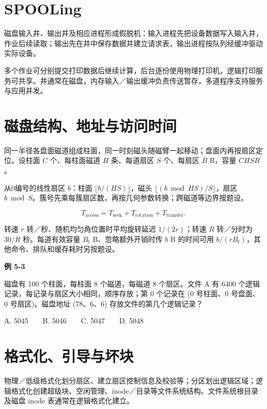 \section{SPOOLing}\label{OS05-spooling}

磁盘输入井、输出井及相应进程形成假脱机：输入进程先把设备数据写入输入井，作业后续读取；输出先在井中保存数据并建立请求表，输出进程按队列经缓冲驱动实际设备。

多个作业可分别提交打印数据后继续计算，后台逐份使用物理打印机，逻辑打印服务可共享。井通常在磁盘，内存输入／输出缓冲负责传送暂存，多道程序支持服务与应用并发。

\section{磁盘结构、地址与访问时间}\label{OS05-disk}

同一半径各盘面磁道组成柱面，同一时刻磁头随磁臂一起移动；盘面内再按扇区定位。设柱面 \(C\) 个、每柱面磁道 \(H\) 条、每道扇区 \(S\) 个、每扇区 \(B\) B，容量 \(CHSB\)。

从0编号的线性扇区 \(b\)：柱面 \(\lfloor b/(HS)\rfloor\)，磁头 \(\lfloor(b\bmod HS)/S\rfloor\)，扇区 \(b\bmod S\)。簇号先乘每簇扇区数，再按几何参数转换；跨磁道等边界按题设。

\[T_{\mathrm{access}}=T_{\mathrm{seek}}+T_{\mathrm{rotation}}+T_{\mathrm{transfer}}.\]

转速 \(r\) 转／秒、随机均匀角位置时平均旋转延迟 \(1/(2r)\)；转速 \(R\) 转／分时为 \(30/R\) 秒。每道有效容量 \(B_t\) B、忽略额外开销时传 \(b\) B 的时间可用 \(b/(rB_t)\)，其他命令、排队和缓存耗时另按题设。

\par\medskip{}\noindent\hypertarget{OS05-E03}{}\label{OS05-E03}\textbf{例 5-3}\par\nobreak\smallskip

磁盘有 100 个柱面，每柱面 8 个磁道，每磁道 8 个扇区。文件 A 有 6400 个逻辑记录，每记录与扇区大小相同，顺序存放；第 0 个记录在 (0 号柱面、0 号盘面、0 号扇区)。磁盘地址 (78、6、6) 存放文件的第几个逻辑记录？

A. 5045　　B. 5046　　C. 5047　　D. 5048

\section{格式化、引导与坏块}\label{OS05-formatting}

物理／低级格式化划分扇区、建立扇区控制信息及校验等；分区划出逻辑区域；逻辑格式化创建超级块、空闲管理、inode／目录等文件系统结构。文件系统根目录及磁盘 inode 表通常在逻辑格式化建立。

